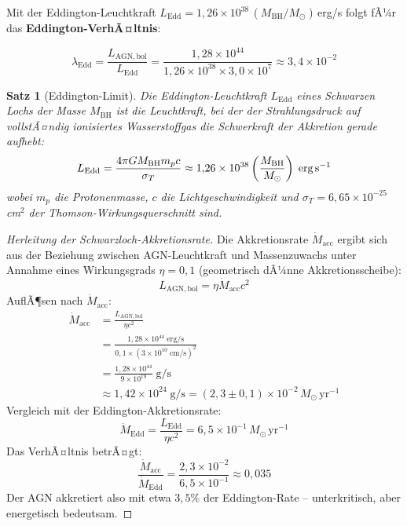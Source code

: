 ﻿\documentclass[12pt,a4paper]{report}
\newtheorem{theorem}{Satz}[chapter]
\begin{document}
Mit der Eddington-Leuchtk\-raft $L_\mathrm{Edd} = 1{,}26 \times 10^{38}\,(M_\mathrm{BH}/M_\odot)$\,erg/s folgt fÃ¼r das \textbf{Eddington-VerhÃ¤ltnis}:

\begin{equation}
	\lambda_\mathrm{Edd} = \frac{L_\mathrm{AGN,bol}}{L_\mathrm{Edd}} = \frac{1{,}28 \times 10^{44}}{1{,}26 \times 10^{38} \times 3{,}0 \times 10^7} \approx 3{,}4 \times 10^{-2}
\end{equation}

\begin{theorem}[Eddington-Limit]
	Die Eddington-Leuchtkraft $L_\mathrm{Edd}$ eines Schwarzen Lochs der Masse $M_\mathrm{BH}$ ist die Leucht\-kraft, bei der der Strahlungsdruck auf vollstÃ¤ndig ionisiertes Wasserstoffgas die Schwer\-kraft der Akkretion gerade aufhebt:
	\begin{equation}
		L_\mathrm{Edd} = \frac{4\pi G M_\mathrm{BH} m_p c}{\sigma_T} \approx 1{,}26 \times 10^{38} \left(\frac{M_\mathrm{BH}}{M_\odot}\right)\;\text{erg\,s}^{-1}
	\end{equation}
	wobei $m_p$ die Protonenmasse, $c$ die Lichtgeschwindigkeit und $\sigma_T = 6{,}65 \times 10^{-25}$\,cm$^2$ der Thomson-Wirkungsquerschnitt sind.
\end{theorem}

\begin{proof}[Herleitung der Schwarzloch-Akkretionsrate]
	Die Akkretionsrate $\dot{M}_\mathrm{acc}$ ergibt sich aus der Beziehung zwischen AGN-Leuchtkraft und Massen\-zuwachs unter Annahme eines Wirkungsgrads $\eta = 0{,}1$ (geometrisch dÃ¼nne Akkretionsscheibe):
	\begin{equation}
		L_\mathrm{AGN,bol} = \eta \dot{M}_\mathrm{acc} c^2
	\end{equation}
	AuflÃ¶sen nach $\dot{M}_\mathrm{acc}$:
	\begin{align}
		\dot{M}_\mathrm{acc} &= \frac{L_\mathrm{AGN,bol}}{\eta c^2} \\
		&= \frac{1{,}28 \times 10^{44}\;\text{erg/s}}{0{,}1 \times (3 \times 10^{10}\;\text{cm/s})^2} \\
		&= \frac{1{,}28 \times 10^{44}}{9 \times 10^{19}}\;\text{g/s} \\
		&\approx 1{,}42 \times 10^{24}\;\text{g/s} = (2{,}3 \pm 0{,}1) \times 10^{-2}\,M_\odot\,\text{yr}^{-1}
	\end{align}
	Vergleich mit der Eddington-Akkretionsrate:
	\begin{equation}
		\dot{M}_\mathrm{Edd} = \frac{L_\mathrm{Edd}}{\eta c^2} = 6{,}5 \times 10^{-1}\,M_\odot\,\text{yr}^{-1}
	\end{equation}
	Das VerhÃ¤ltnis betrÃ¤gt:
	\begin{equation}
		\frac{\dot{M}_\mathrm{acc}}{\dot{M}_\mathrm{Edd}} = \frac{2{,}3 \times 10^{-2}}{6{,}5 \times 10^{-1}} \approx 0{,}035
	\end{equation}
	Der AGN akkretiert also mit etwa $3{,}5\%$ der Eddington-Rate -- unterkritisch, aber energetisch bedeutsam.
\end{proof}
\end{document}
